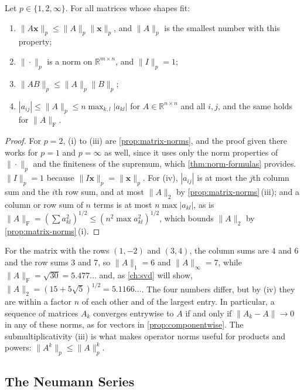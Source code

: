 \begin{proposition}
\label{prop:operator-norms}
Let $p\in\{1,2,\infty\}$. For all matrices whose shapes fit:
\begin{enumerate}
\item $\|A\mathbf x\|_p\le\|A\|_p\|\mathbf x\|_p$, and $\|A\|_p$ is the smallest number with this property;
\item $\|\cdot\|_p$ is a norm on $\mathbb R^{m\times n}$, and $\|I\|_p=1$;
\item $\|AB\|_p\le\|A\|_p\|B\|_p$;
\item $|a_{ij}|\le\|A\|_p\le n\max_{k,l}|a_{kl}|$ for $A\in\mathbb R^{n\times n}$ and all $i,j$, and the same holds for $\|A\|_{\mathrm F}$.
\end{enumerate}
\end{proposition}

\begin{proof}
For $p=2$, (i) to (iii) are \cref{prop:matrix-norms}, and the proof given there works for $p=1$ and $p=\infty$ as well, since it uses only the norm properties of $\|\cdot\|_p$ and the finiteness of the supremum, which \cref{thm:norm-formulas} provides. $\|I\|_p=1$ because $\|I\mathbf x\|_p=\|\mathbf x\|_p$. For (iv), $|a_{ij}|$ is at most the $j$th column sum and the $i$th row sum, and at most $\|A\|_2$ by \cref{prop:matrix-norms}\,(iii); and a column or row sum of $n$ terms is at most $n\max|a_{kl}|$, as is $\|A\|_{\mathrm F}=(\sum a_{kl}^2)^{1/2}\le(n^2\max a_{kl}^2)^{1/2}$, which bounds $\|A\|_2$ by \cref{prop:matrix-norms}\,(i).
\end{proof}

For the matrix with the rows $(1,-2)$ and $(3,4)$, the column sums are $4$ and $6$ and the row sums $3$ and $7$, so $\|A\|_1=6$ and $\|A\|_\infty=7$, while $\|A\|_{\mathrm F}=\sqrt{30}=5.477\ldots$ and, as \cref{ch:svd} will show, $\|A\|_2=(15+5\sqrt5)^{1/2}=5.1166\ldots$. The four numbers differ, but by (iv) they are within a factor $n$ of each other and of the largest entry. In particular, a sequence of matrices $A_k$ converges entrywise to $A$ if and only if $\|A_k-A\|\to0$ in any of these norms, as for vectors in \cref{prop:componentwise}. The submultiplicativity (iii) is what makes operator norms useful for products and powers: $\|A^k\|_p\le\|A\|_p^k$.

\subsection{The Neumann Series}

